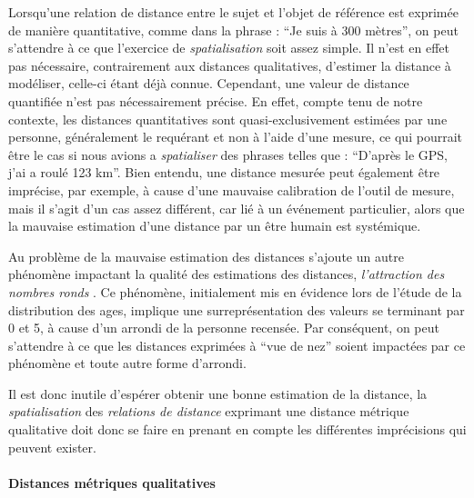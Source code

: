 Lorsqu'une relation de distance entre le sujet et l'objet de référence
est exprimée de manière quantitative, comme dans la phrase :
\enquote{Je suis à 300 mètres}, on peut s'attendre à ce que l'exercice
de \emph{spatialisation} soit assez simple. Il n'est en effet pas
nécessaire, contrairement aux distances qualitatives, d'estimer la
distance à modéliser, celle-ci étant déjà connue. Cependant, une
valeur de distance quantifiée n'est pas nécessairement précise. En
effet, compte tenu de notre contexte, les distances quantitatives sont
quasi-exclusivement estimées par une personne, généralement le
requérant et non à l'aide d'une mesure, ce qui pourrait être le cas si
nous avions a \emph{spatialiser} des phrases telles que :
\enquote{D'après le GPS, j'ai a roulé 123 km}. Bien entendu, une
distance mesurée peut également être imprécise, par exemple, à cause
d'une mauvaise calibration de l'outil de mesure, mais il s'agit d'un
cas assez différent, car lié à un événement particulier, alors que la
mauvaise estimation d'une distance par un être humain est systémique.

Au problème de la mauvaise estimation des distances s'ajoute un autre
phénomène impactant la qualité des estimations des distances,
\emph{l'attraction des nombres ronds} \autocite{Durand1961}. Ce
phénomène, initialement mis en évidence lors de l'étude de la
distribution des ages, implique une surreprésentation des valeurs se
terminant par 0 et 5, à cause d'un arrondi de la personne
recensée. Par conséquent, on peut s'attendre à ce que les distances
exprimées à \enquote{vue de nez} soient impactées par ce phénomène et
toute autre forme d'arrondi.

Il est donc inutile d'espérer obtenir une bonne estimation de la
distance, la \emph{spatialisation} des \emph{relations de distance}
exprimant une distance métrique qualitative doit donc se faire en
prenant en compte les différentes imprécisions qui peuvent exister.

\paragraph{Distances métriques qualitatives}



